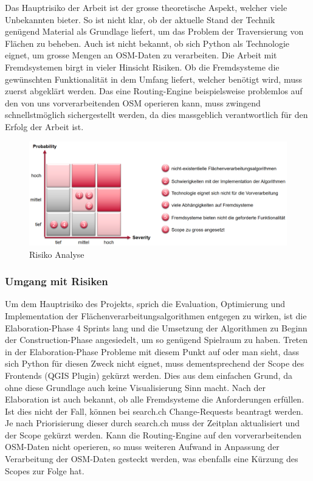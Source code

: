 Das Hauptrisiko der Arbeit ist der grosse theoretische Aspekt, welcher viele Unbekannten bieter. So ist nicht klar, ob der aktuelle Stand der Technik genügend Material als Grundlage liefert, um das Problem der Traversierung von Flächen zu beheben. Auch ist nicht bekannt, ob sich Python als Technologie eignet, um grosse Mengen an \ac{OSM}-Daten zu verarbeiten. Die Arbeit mit Fremdsystemen birgt in vieler Hinsicht Risiken. Ob die Fremdsysteme die gewünschten Funktionalität in dem Umfang liefert, welcher benötigt wird, muss zuerst abgeklärt werden. Das eine Routing-Engine beispielsweise problemlos auf den von uns vorverarbeitenden \ac{OSM} operieren kann, muss zwingend schnellstmöglich sichergestellt werden, da dies massgeblich verantwortlich für den Erfolg der Arbeit ist.

\begin{figure}[ht]
    \centering
    \includegraphics[width=1\linewidth]{projectdoc/img/risk_analysis}
    \caption[Risiko Analyse]{Risiko Analyse}
    \label{fig:risk_analysis}
\end{figure}

\subsubsection{Umgang mit Risiken}
\label{Risiken:Umang mit Risiken}
Um dem Hauptrisiko des Projekts, sprich die Evaluation, Optimierung und Implementation der Flächenverarbeitungsalgorithmen entgegen zu wirken, ist die Elaboration-Phase 4 Sprints lang und die Umsetzung der Algorithmen zu Beginn der Construction-Phase angesiedelt, um so genügend Spielraum zu haben. Treten in der Elaboration-Phase Probleme mit diesem Punkt auf oder man sieht, dass sich Python für diesen Zweck nicht eignet, muss dementsprechend der Scope des Frontends (QGIS Plugin) gekürzt werden. Dies aus dem einfachen Grund, da ohne diese Grundlage auch keine Visualisierung Sinn macht. Nach der Elaboration ist auch bekannt, ob alle Fremdsysteme die Anforderungen erfüllen. Ist dies nicht der Fall, können bei search.ch \cite{search_ch_route_api} Change-Requests beantragt werden. Je nach Priorisierung dieser durch search.ch muss der Zeitplan aktualisiert und der Scope gekürzt werden. Kann die Routing-Engine auf den vorverarbeitenden \ac{OSM}-Daten nicht operieren, so muss weiteren Aufwand in Anpassung der Verarbeitung der \ac{OSM}-Daten gesteckt werden, was ebenfalls eine Kürzung des Scopes zur Folge hat.

